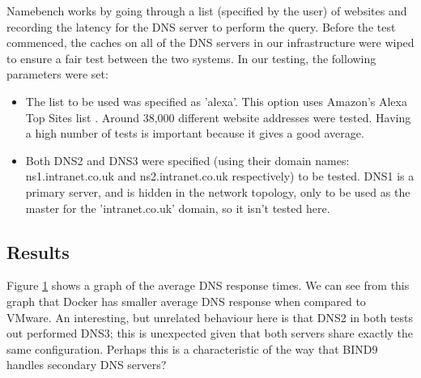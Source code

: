 Namebench works by going through a list (specified by the user) of websites and recording the latency for the DNS server to perform the query\citep{Namebench}. Before the test commenced, the caches on all of the DNS servers in our infrastructure were wiped to ensure a fair test between the two systems. In our testing, the following parameters were set:
\begin{itemize}
  \item The list to be used was specified as 'alexa'. This option uses Amazon's Alexa Top Sites list \citep{alexainternet}. Around 38,000 different website addresses were tested. Having a high number of tests is important because it gives a good average.
  \item Both DNS2 and DNS3 were specified (using their domain names: ns1.intranet.co.uk and ns2.intranet.co.uk respectively) to be tested. DNS1 is a primary server, and is hidden in the network topology, only to be used as the master for the 'intranet.co.uk' domain, so it isn't tested here.
\end{itemize}

\subsection{Results}
Figure \ref{fig:test3graphaverage} shows a graph of the average DNS response times. We can see from this graph that Docker has smaller average DNS response when compared to VMware. An interesting, but unrelated behaviour here is that DNS2 in both tests out performed DNS3; this is unexpected given that both servers share exactly the same configuration. Perhaps this is a characteristic of the way that BIND9 handles secondary DNS servers?

\begin{figure}[H]
\caption{}
\label{fig:test3graphaverage}
\centering
\end{figure}

